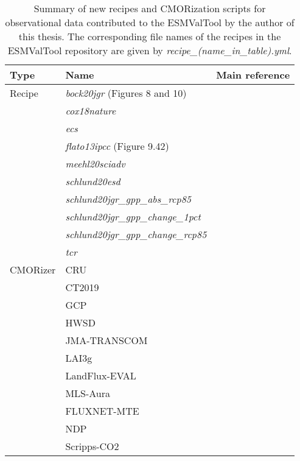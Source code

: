 \begin{table}[t]
  \centering
  \begin{tabulary}{\columnwidth}{L L L}
    \toprule
    Type & Name & Main reference \\
    \midrule
    Recipe & \emph{bock20jgr} (Figures 8 and 10) & \autocite{Bock2020} \\
    & \emph{cox18nature} & \autocite{Cox2018} \\
    & \emph{ecs} & \autocite{Gregory2004} \\
    & \emph{flato13ipcc} (Figure 9.42) & \autocite{Flato2013} \\
    & \emph{meehl20sciadv} & \autocite{Meehl2020} \\
    & \emph{schlund20esd} & \autocite{Schlund2020a} \\
    & \emph{schlund20jgr\_gpp\_abs\_rcp85} & \autocite{Schlund2020} \\
    & \emph{schlund20jgr\_gpp\_change\_1pct} & \autocite{Schlund2020} \\
    & \emph{schlund20jgr\_gpp\_change\_rcp85} & \autocite{Schlund2020} \\
    & \emph{tcr} & \autocite{Gregory2008} \\
    \midrule
    \acs{CMOR}izer & CRU & \autocite{Harris2014} \\
    & CT2019 & \autocite{Jacobson2020} \\
    & GCP & \autocite{Friedlingstein2020} \\
    & HWSD & \autocite{Wieder2014} \\
    & JMA-TRANSCOM & \autocite{Maki2010} \\
    & LAI3g & \autocite{Zhu2013} \\
    & LandFlux-EVAL & \autocite{Mueller2013} \\
    & MLS-Aura & \autocite{Read2015} \\
    & FLUXNET-MTE & \autocite{Jung2011} \\
    & NDP & \autocite{Gibbs2006} \\
    & Scripps-\acs{CO2} & \autocite{Keeling2005} \\
    \bottomrule
  \end{tabulary}
  \caption[
    Summary of new recipes and \acs{CMOR}ization scripts for observational data
    contributed to the \acf{ESMValTool} by the author of this thesis.
  ]{
    Summary of new recipes and \acs{CMOR}ization scripts for observational data
    contributed to the \acf{ESMValTool} by the author of this thesis. The
    corresponding file names of the recipes in the \acs{ESMValTool} repository
    are given by \emph{recipe\_(name\_in\_table).yml}.
  }
  \label{tab:03:changes_to_esmvaltool}
\end{table}

